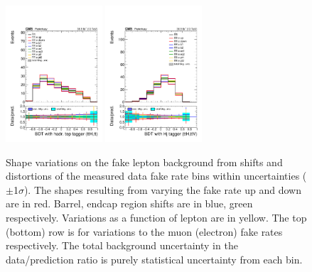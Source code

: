 \begin{figure}[htb]
        \includegraphics[width=0.32\textwidth]{ch9_figs/kinMVA_2lss_e_ttbar_withBDTv8.pdf}
        \includegraphics[width=0.32\textwidth]{ch9_figs/kinMVA_2lss_e_ttV_withHj.pdf}
        \caption[Variations in discriminant shape due to fake rate systematics]{Shape variations on the fake lepton background from shifts and distortions
          of the measured data fake rate bins within uncertainties ($\pm$1$\sigma$). 
          The shapes resulting from varying the fake rate up and down are in red. Barrel, endcap region shifts are in blue, green respectively. Variations as a function
          of lepton \pt are in yellow. The top (bottom) row is for variations to the muon (electron) fake rates respectively. The total background uncertainty in the
          data/prediction ratio is purely statistical uncertainty from each bin.}
        \label{fig:FRvars_shape}
\end{figure}

